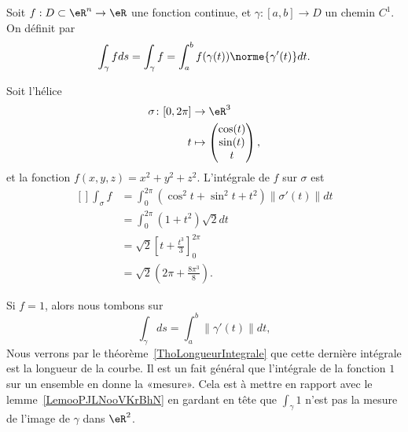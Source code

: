 \begin{definition}      \label{DEFooFAYUooCaUdyo}
    Soit $f : D \subset \eR^n \to \eR$ une fonction continue, et $\gamma : [a,b] \to D$ un chemin $C^1$. On définit  par
      \begin{equation}    \label{EqhJGRcb}
      \int_\gamma f d s = \int_\gamma f = \int_a^b f(\gamma(t)) \norme{\gamma^\prime(t)} d t.
    \end{equation}
\end{definition}

\begin{example}
    Soit l'hélice
    \begin{equation}
        \begin{aligned}
            \sigma\colon \mathopen[ 0 , 2\pi \mathclose]&\to \eR^3 \\
            t&\mapsto \begin{pmatrix}
                \cos(t)    \\
                \sin(t)    \\
                t
            \end{pmatrix},
        \end{aligned}
    \end{equation}
    et la fonction $f(x,y,z)=x^2+y^2+z^2$. L'intégrale de $f$ sur $\sigma$ est
    \begin{equation}
        \begin{aligned}[]
            \int_{\sigma}f&=\int_0^{2\pi}(\cos^2t+\sin^2t+t^2)\| \sigma'(t) \|dt\\
            &=\int_0^{2\pi}(1+t^2)\sqrt{2}dt\\
            &=\sqrt{2}\left[ t+\frac{ t^3 }{ 3 } \right]_0^{2\pi}\\
            &=\sqrt{2}\left( 2\pi+\frac{ 8\pi^3 }{ 8 } \right).
        \end{aligned}
    \end{equation}
\end{example}

\begin{remark}
    Si $f=1$, alors nous tombons sur
    \begin{equation}
        \int_{\gamma}ds=\int_a^b\| \gamma'(t) \|dt,
    \end{equation}
    Nous verrons par le théorème~\ref{ThoLongueurIntegrale} que cette dernière intégrale est la longueur de la courbe. Il est un fait général que l'intégrale de la fonction \( 1\) sur un ensemble en donne la «mesure».
    Cela est à mettre en rapport avec le lemme~\ref{LemooPJLNooVKrBhN} en gardant en tête que \( \int_{\gamma}1\) n'est pas la mesure de l'image de \( \gamma\) dans \( \eR^2\).
\end{remark}

